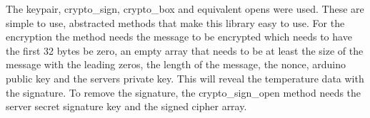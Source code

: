 The keypair, crypto\_sign, crypto\_box and equivalent opens were used. These are simple to use, abstracted methods that make this library easy to use. For the encryption the method needs the message to be encrypted which needs to have the first 32 bytes be zero, an empty array that needs to be at least the size of the message with the leading zeros, the length of the message, the nonce, arduino public key and the servers private key. This will reveal the temperature data with the signature. To remove the signature, the crypto\_sign\_open method needs the server secret signature key and the signed cipher array.